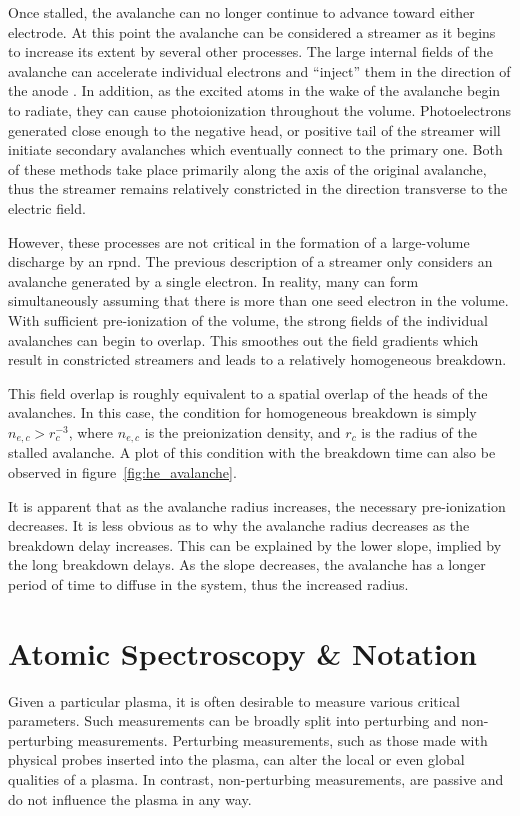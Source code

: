 Once stalled, the avalanche can no longer continue to advance toward either
electrode. At this point the avalanche can be considered a streamer as it begins
to increase its extent by several other processes. The large internal fields of
the avalanche can accelerate individual electrons and ``inject'' them in the
direction of the anode \cite{Kunhardt1980}. In addition, as the excited atoms in
the wake of the avalanche begin to radiate, they can cause photoionization
throughout the volume. Photoelectrons generated close enough to the negative
head, or positive tail of the streamer will initiate secondary avalanches which
eventually connect to the primary one. Both of these methods take place
primarily along the axis of the original avalanche, thus the streamer remains
relatively constricted in the direction transverse to the electric field.

However, these processes are not critical in the formation of a large-volume
discharge by an \acs{rpnd}. The previous description of a streamer only
considers an avalanche generated by a single electron. In reality, many can form
simultaneously assuming that there is more than one seed electron in the volume.
With sufficient pre-ionization of the volume, the strong fields of the
individual avalanches can begin to overlap. This smoothes out the field
gradients which result in constricted streamers and leads to a relatively
homogeneous breakdown.

This field overlap is roughly equivalent to a spatial overlap of the heads of
the avalanches. In this case, the condition for homogeneous breakdown is simply
$n_{e,c} > r_c^{-3}$, where $n_{e,c}$ is the preionization density, and $r_c$ is
the radius of the stalled avalanche. A plot of this condition with the breakdown
time can also be observed in figure~\ref{fig:he_avalanche}.

It is apparent that as the avalanche radius increases, the necessary
pre-ionization decreases. It is less obvious as to why the avalanche radius
decreases as the breakdown delay increases. This can be explained by the lower
slope, implied by the long breakdown delays. As the slope decreases, the
avalanche has a longer period of time to diffuse in the system, thus the
increased radius.

\section{Atomic Spectroscopy \& Notation}

Given a particular plasma, it is often desirable to measure various critical
parameters. Such measurements can be broadly split into perturbing and
non-perturbing measurements. Perturbing measurements, such as those made with
physical probes inserted into the plasma, can alter the local or even global
qualities of a plasma. In contrast, non-perturbing measurements, are passive and
do not influence the plasma in any way.

